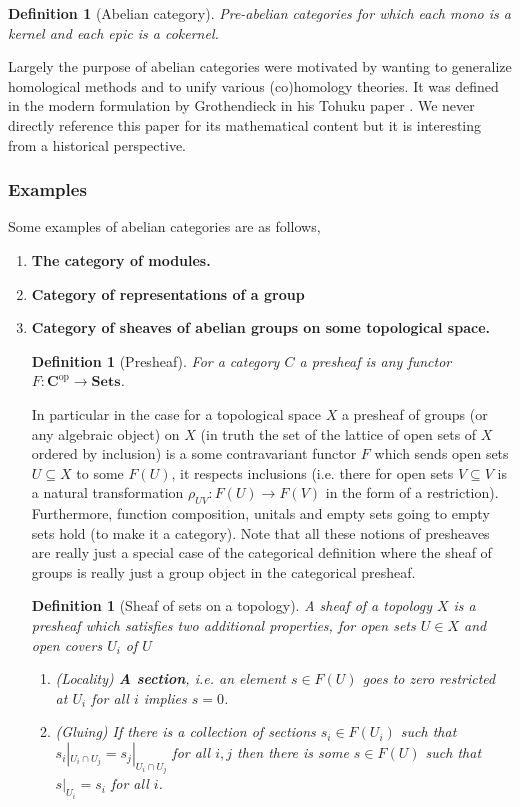 \documentclass[12pt]{article}
\numberwithin{equation}{section}
\newcounter{dummy} \numberwithin{dummy}{section}
\newtheorem{definition}[dummy]{Definition}
\begin{document}
\begin{appendices}
	
	\begin{definition}[Abelian category]
		Pre-abelian categories for which each mono is a kernel and each epic is a cokernel.
	\end{definition}
	Largely the purpose of abelian categories were motivated by wanting to generalize homological methods and to unify various (co)homology theories. It was defined in the modern formulation by Grothendieck in his Tohuku paper \cite{grothendieck1957quelques}. We never directly reference this paper for its mathematical content but it is interesting from a historical perspective.
	\subsubsection{Examples}
	Some examples of abelian categories are as follows,
	\begin{enumerate}
		\item \textbf{The category of modules.}
		\item\textbf{Category of representations of a group}
		\item \textbf{Category of sheaves of abelian groups on some topological space.}
		
		\begin{definition}[Presheaf]
			For a category $C$ a presheaf is any functor $F: \mathbf{C}^{\mathrm{op}}\to \mathbf{Sets}$.
		\end{definition}
		In particular in the case for a topological space $X$ a presheaf of groups (or any algebraic object) on $X$ (in truth the set of the lattice of open sets of $X$ ordered by inclusion) is a some contravariant functor $F$ which sends open sets $U \subseteq X$ to some $F(U)$, it respects inclusions (i.e. there for open sets $V \subseteq V $ is a natural transformation $\rho_{UV}: F(U)\to F(V)$ in the form of a restriction). Furthermore, function composition, unitals and empty sets going to empty sets hold (to make it a category). Note that all these notions of presheaves are really just a special case of the categorical definition where the sheaf of groups is really just a group object in the categorical presheaf.
		\begin{definition}[Sheaf of sets on a topology]\label{def:scheaf}
			A sheaf of a topology $X$ is a presheaf which satisfies two additional properties, for open sets $U \in X$ and open covers ${U_i}$ of $U$
			\begin{enumerate}
				\item (Locality)  \textbf{A section}, i.e. an element $s \in F(U)$ goes to zero restricted at $U_i$ for all $i$ implies $s=0$.
				\item (Gluing) If there is a collection of sections $s_i \in F(U_i)$ such that $s_i|_{U_i \cap U_j}=s_j|_{U_i \cap U_j}$ for all $i,j$ then there is some $s \in F(U)$ such that $s|_{U_i}=s_i$ for all $i$.
			\end{enumerate}
			

\end{definition}
\end{enumerate}
\end{appendices}
\end{document}
